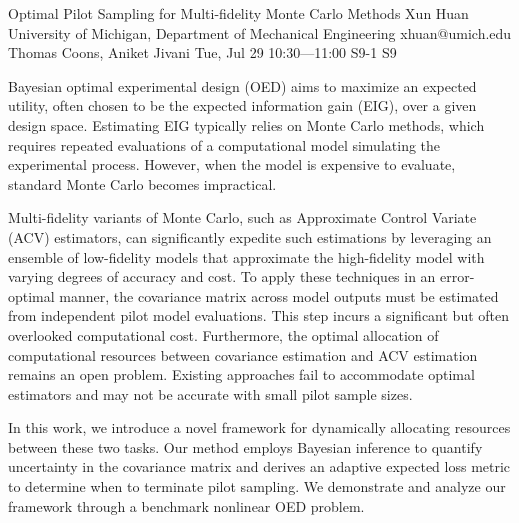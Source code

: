 \begin{talk}
  {Optimal Pilot Sampling for Multi-fidelity Monte Carlo Methods}%
  {Xun Huan}%
  {University of Michigan, Department of Mechanical Engineering}%
  {xhuan@umich.edu}%
  {Thomas Coons, Aniket Jivani}%
  {}%
  {Tue, Jul 29 10:30---11:00}%
  {S9-1}%
  {S9}%
  
    

Bayesian optimal experimental design (OED) aims to maximize an expected utility, often chosen to be the expected information gain (EIG), over a given design space. Estimating EIG typically relies on Monte Carlo methods, which requires repeated evaluations of a computational model simulating the experimental process. 
However, when the model is expensive to evaluate, standard Monte Carlo becomes impractical.

Multi-fidelity variants of Monte Carlo, such as Approximate Control Variate (ACV) estimators, can significantly expedite such estimations by leveraging an ensemble of low-fidelity models that approximate the high-fidelity model with varying degrees of accuracy and cost. 
To apply these techniques in an error-optimal manner, the covariance matrix across model outputs must be estimated from independent pilot model evaluations. This step incurs a significant but often overlooked computational cost. 
Furthermore, the optimal allocation of computational resources between 
covariance estimation and 
ACV estimation remains an open problem.  Existing approaches fail to accommodate optimal estimators and may not be accurate with small pilot sample sizes.

In this work, we introduce a novel framework for dynamically allocating resources between these two tasks.
Our method employs Bayesian inference
to quantify uncertainty in the covariance matrix and derives an adaptive expected loss metric
to determine when to terminate pilot sampling. 
We demonstrate and analyze our framework through a benchmark nonlinear OED problem. 


\end{talk}
